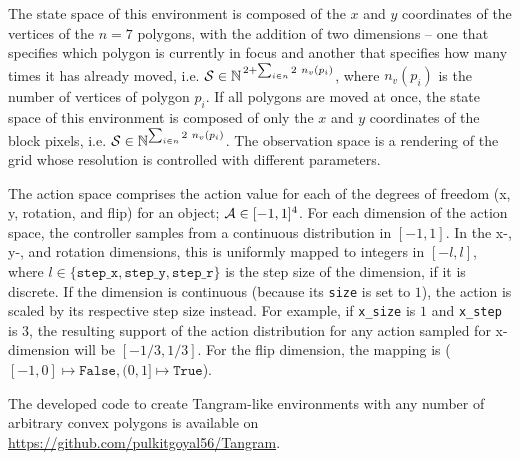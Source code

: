 The state space of this environment is composed of the \(x\) and \(y\) coordinates of the vertices of the \(n = 7\) polygons, with the addition of two dimensions -- one that specifies which polygon is currently in focus and another that specifies how many times it has already moved, i.e. \(\mathcal{S} \in \mathbb{N}^{\,2 + \sum_{i \in n} 2\ n_v(p_i)}\), where \(n_v(p_i)\) is the number of vertices of polygon \(p_i\).
If all polygons are moved at once, the state space of this environment is composed of only the \(x\) and \(y\) coordinates of the block pixels, i.e. \(\mathcal{S} \in \mathbb{N}^{\sum_{i \in n} 2\ n_v(p_i)}\).
The observation space is a rendering of the grid whose resolution is controlled with different parameters.

The action space comprises the action value for each of the degrees of freedom (x, y, rotation, and flip) for an object; \(\mathcal{A} \in [-1, 1]^4\).
For each dimension of the action space, the controller samples from a continuous distribution in \([-1, 1]\).
In the x-, y-, and rotation dimensions, this is uniformly mapped to integers in \([-l, l]\), where \(l \in \{\texttt{step\_x}, \texttt{step\_y}, \texttt{step\_r}\}\) is the step size of the dimension, if it is discrete.
If the dimension is continuous (because its \texttt{size} is set to \(1\)), the action is scaled by its respective step size instead.
For example, if \texttt{x\_size} is \(1\) and \texttt{x\_step} is \(3\), the resulting support of the action distribution for any action sampled for x-dimension will be \([-1/3, 1/3]\).
For the flip dimension, the mapping is (\([-1, 0] \mapsto \texttt{False}, (0, 1] \mapsto \texttt{True}\)).

The developed code to create Tangram-like environments with any number of arbitrary convex polygons is available on \url{https://github.com/pulkitgoyal56/Tangram}.


